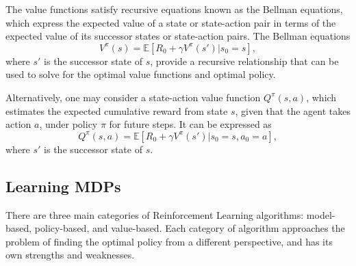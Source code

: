The value functions satisfy recursive equations known as the Bellman equations, which express the expected value of a state or state-action pair in terms of the expected value of its successor states or state-action pairs.
The Bellman equations
\begin{equation}
    V^{\pi}(s) = \mathbb{E} \left[ R_0 + \gamma V^{\pi}(s') | s_0 = s \right],
\end{equation}
where $s'$ is the successor state of $s$, provide a recursive relationship that can be used to solve for the optimal value functions and optimal policy.

Alternatively, one may consider a state-action value function $Q^{\pi}(s, a)$, which estimates the expected cumulative reward from state $s$, given that the agent takes action $a$, under policy $\pi$ for future steps.
It can be expressed as
\begin{equation}
    Q^{\pi}(s, a) = \mathbb{E} \left[ R_0 + \gamma V^{\pi}(s') | s_0 = s, a_0 = a \right],
\end{equation}
where $s'$ is the successor state of $s$.

\subsection{Learning MDPs}
There are three main categories of Reinforcement Learning algorithms: model-based, policy-based, and value-based. Each category of algorithm approaches the problem of finding the optimal policy from a different perspective, and has its own strengths and weaknesses.

